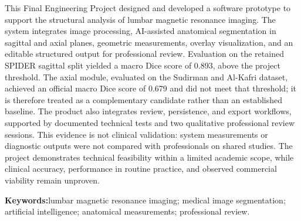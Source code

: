 \begin{Abstract}
This Final Engineering Project designed and developed a software prototype to support the structural analysis of lumbar magnetic resonance imaging. The system integrates image processing, AI-assisted anatomical segmentation in sagittal and axial planes, geometric measurements, overlay visualization, and an editable structured output for professional review. Evaluation on the retained SPIDER sagittal split yielded a macro Dice score of 0.893, above the project threshold. The axial module, evaluated on the Sudirman and Al-Kafri dataset, achieved an official macro Dice score of 0.679 and did not meet that threshold; it is therefore treated as a complementary candidate rather than an established baseline. The product also integrates review, persistence, and export workflows, supported by documented technical tests and two qualitative professional review sessions. This evidence is not clinical validation: system measurements or diagnostic outputs were not compared with professionals on shared studies. The project demonstrates technical feasibility within a limited academic scope, while clinical accuracy, performance in routine practice, and observed commercial viability remain unproven.

\vspace{0.5em}
\noindent\textbf{Keywords:}\enspace lumbar magnetic resonance imaging; medical image segmentation; artificial intelligence; anatomical measurements; professional review.
\end{Abstract}
